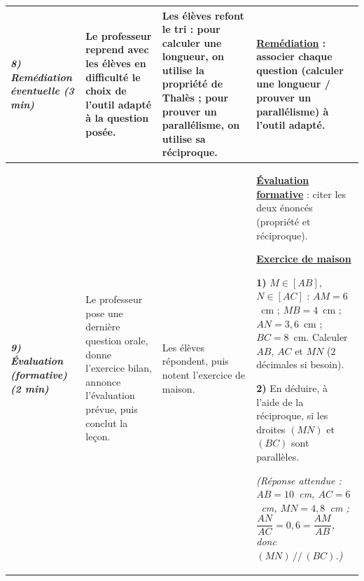 \documentclass[10pt]{article}
\newcommand{\titreR}[1]{\underline{\textcolor{rougetitre}{\bfseries #1}}}
\newcommand{\maison}{\underline{\textcolor{rougemaison}{\bfseries Exercice de maison}}}
\newcommand{\moment}[1]{\textbf{\itshape #1}}
\begin{document}
\begin{longtable}{|p{2.35cm}|p{5.35cm}|p{4.55cm}|p{13.85cm}|}
\moment{8) Remédiation éventuelle (3 min)} &
Le professeur reprend avec les élèves en difficulté  le choix de l'outil adapté à la question posée. &
Les élèves refont le tri : pour calculer une longueur, on utilise la propriété de Thalès ; pour prouver un parallélisme, on utilise sa réciproque. &
\titreR{Remédiation} : associer chaque question (calculer une longueur / prouver un
parallélisme) à l'outil adapté. \\ \hline

\moment{9) Évaluation (formative) (2 min)} &
Le professeur pose une dernière question orale, donne l'exercice bilan, annonce l'évaluation prévue, puis conclut la leçon. &
Les élèves répondent, puis notent l'exercice de maison. &
\titreR{Évaluation formative} : citer les deux énoncés (propriété et réciproque). \par
\maison \par
\textbf{1)} $M\in[AB]$, $N\in[AC]$ : $AM=6$~cm ; $MB=4$~cm ; $AN=3{,}6$~cm ;
$BC=8$~cm. Calculer $AB$, $AC$ et $MN$ ($2$ décimales si besoin). \par
\textbf{2)} En déduire, à l'aide de la réciproque, si les droites $(MN)$ et $(BC)$ sont parallèles. \par
\textit{(Réponse attendue : $AB=10$~cm, $AC=6$~cm, $MN=4{,}8$~cm ; $\dfrac{AN}{AC}=0{,}6=\dfrac{AM}{AB}$, donc $(MN)\,//\,(BC)$.)} \\ \hline
\end{longtable}
\end{document}

